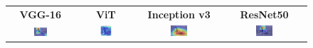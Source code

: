 \documentclass[a4paper,12pt]{report}
\begin{document}
\begin{figure}[H]
    \centering
    \setlength{\tabcolsep}{1pt}
    \begin{tabular}{cccc}
    \textbf{VGG-16} & \textbf{ViT} & \textbf{Inception v3} & \textbf{ResNet50} \\
    
    \includegraphics[width=0.22\textwidth]{images/appendix/modelgraph/vgg/correct/Slaty_Backed_Gull/480 (14).jpeg} &
    \includegraphics[width=0.22\textwidth]{images/appendix/modelgraph/vit/correct/Slaty_Backed_Gull/480 (14).jpeg} &
    \includegraphics[width=0.22\textwidth]{images/appendix/modelgraph/inception/correct/Slaty_Backed_Gull/480 (14).jpeg} &
    \includegraphics[width=0.22\textwidth]{images/appendix/modelgraph/resnet/correct/Slaty_Backed_Gull/480 (14).jpeg} \\
    \end{tabular}

    \label{fig:interpretability_slaty_6}
\end{figure}
\end{document}
